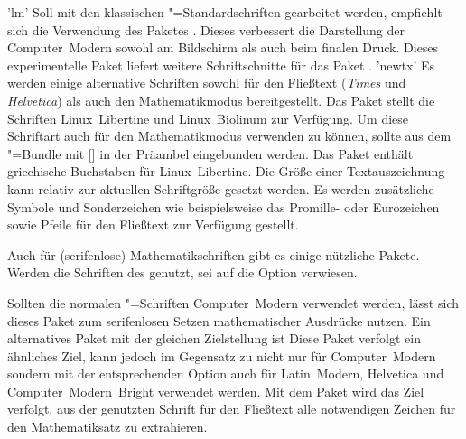 \begin{DeclarePackages}
'lm'
  Soll mit den klassischen "=Standardschriften gearbeitet werden, 
  empfiehlt sich die Verwendung des Paketes . Dieses 
  verbessert die Darstellung der Computer~Modern sowohl am Bildschirm als auch 
  beim finalen Druck.
  Dieses experimentelle Paket liefert weitere Schriftschnitte für das Paket 
  .
'newtx'
  Es werden einige alternative Schriften sowohl für den Fließtext 
  (\textit{Times} und \textit{Helvetica}) als auch den Mathematikmodus 
  bereitgestellt.
  Das Paket stellt die Schriften Linux~Libertine und Linux~Biolinum zur 
  Verfügung. Um diese Schriftart auch für den Mathematikmodus verwenden zu 
  können, sollte  aus dem "=Bundle mit 
  [] in der 
  Präambel eingebunden werden. Das Paket  enthält griechische 
  Buchstaben für Linux~Libertine.
  Die Größe einer Textauszeichnung kann relativ zur aktuellen Schriftgröße 
  gesetzt werden.
  Es werden zusätzliche Symbole und Sonderzeichen wie beispielsweise das 
  Promille- oder Eurozeichen sowie Pfeile für den Fließtext zur Verfügung 
  gestellt.
\end{DeclarePackages}

%
Auch für (serifenlose) Mathematikschriften gibt es einige nützliche Pakete. 
Werden die Schriften des \CDs genutzt, sei auf die Option  
verwiesen.

\begin{DeclarePackages}
  Sollten die normalen "=Schriften Computer~Modern verwendet 
  werden, lässt sich dieses Paket zum serifenlosen Setzen mathematischer 
  Ausdrücke nutzen. Ein alternatives Paket mit der gleichen Zielstellung ist 
  Diese Paket verfolgt ein ähnliches Ziel, kann jedoch im Gegensatz zu 
   nicht nur für Computer~Modern sondern mit der 
  entsprechenden Option auch für Latin~Modern, Helvetica und 
  Computer~Modern~Bright verwendet werden.
  Mit dem Paket wird das Ziel verfolgt, aus der genutzten Schrift für den 
  Fließtext alle notwendigen Zeichen für den Mathematiksatz zu extrahieren.
\end{DeclarePackages}



